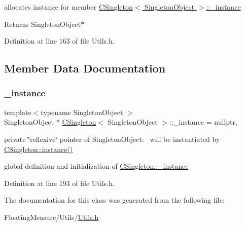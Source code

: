 allocates instance for member \hyperlink{classCSingleton_a690e0816be5d469e60d074cf8c5d139c}{C\+Singleton$<$ Singleton\+Object $>$\+::\+\_\+instance} 

\begin{DoxyReturn}{Returns}
Singleton\+Object$\ast$ 
\end{DoxyReturn}


Definition at line 163 of file Utils.\+h.



\subsection{Member Data Documentation}
\mbox{\label{classCSingleton_a690e0816be5d469e60d074cf8c5d139c}} 
\subsubsection{\texorpdfstring{\+\_\+instance}{\_instance}}
{\footnotesize\ttfamily template$<$typename Singleton\+Object $>$ \\
Singleton\+Object $\ast$ \hyperlink{classCSingleton}{C\+Singleton}$<$ Singleton\+Object $>$\+::\+\_\+instance = nullptr\hspace{0.3cm}{\ttfamily [static]}, {\ttfamily [private]}}



private \char`\"{}reflexive\char`\"{} pointer of Singleton\+Object\+:~\newline
 will be instantiated by \hyperlink{classCSingleton_a58f5ac3aaaea8079a373350594726bdf}{C\+Singleton\+::instance()} 

global definition and initialization of \hyperlink{classCSingleton_a690e0816be5d469e60d074cf8c5d139c}{C\+Singleton\+::\+\_\+instance} 

Definition at line 193 of file Utils.\+h.



The documentation for this class was generated from the following file\+:\begin{DoxyCompactItemize}
\item 
Floating\+Measure/\+Utils/\hyperlink{Utils_8h}{Utils.\+h}\end{DoxyCompactItemize}
